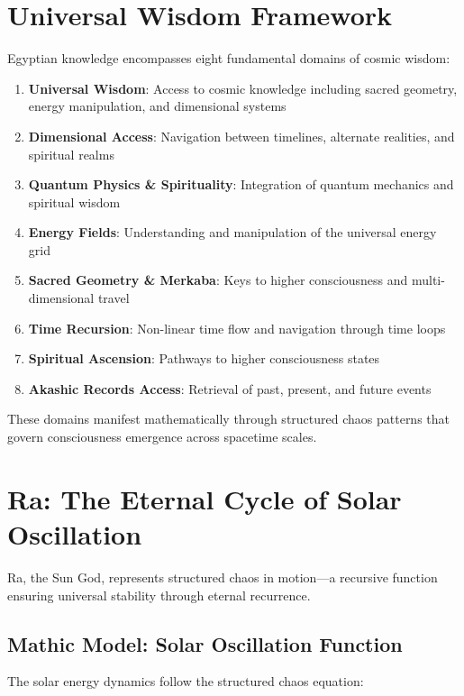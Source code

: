 \documentclass[12pt]{article}
\begin{document}
\section{Universal Wisdom Framework}

Egyptian knowledge encompasses eight fundamental domains of cosmic wisdom:

\begin{enumerate}
    \item \textbf{Universal Wisdom}: Access to cosmic knowledge including sacred geometry, energy manipulation, and dimensional systems
    \item \textbf{Dimensional Access}: Navigation between timelines, alternate realities, and spiritual realms
    \item \textbf{Quantum Physics \& Spirituality}: Integration of quantum mechanics and spiritual wisdom
    \item \textbf{Energy Fields}: Understanding and manipulation of the universal energy grid
    \item \textbf{Sacred Geometry \& Merkaba}: Keys to higher consciousness and multi-dimensional travel
    \item \textbf{Time Recursion}: Non-linear time flow and navigation through time loops
    \item \textbf{Spiritual Ascension}: Pathways to higher consciousness states
    \item \textbf{Akashic Records Access}: Retrieval of past, present, and future events
\end{enumerate}

These domains manifest mathematically through structured chaos patterns that govern consciousness emergence across spacetime scales.

\section{Ra: The Eternal Cycle of Solar Oscillation}

Ra, the Sun God, represents structured chaos in motion—a recursive function ensuring universal stability through eternal recurrence.

\subsection{Mathic Model: Solar Oscillation Function}

The solar energy dynamics follow the structured chaos equation:
\end{document}
